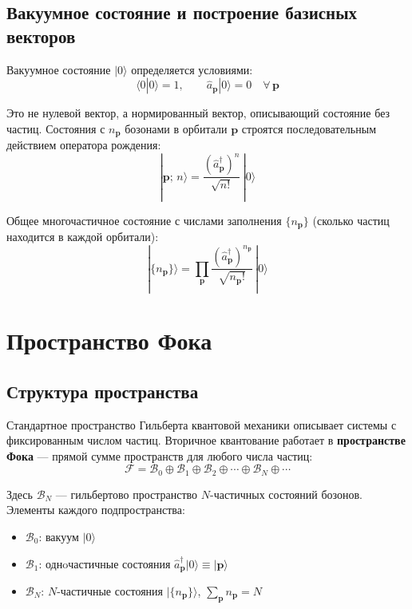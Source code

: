 \documentclass[../general/general]{subfiles}
\begin{document}
\subsection{Вакуумное состояние и построение базисных векторов}

Вакуумное состояние $|0\rangle$ определяется условиями:
\begin{equation}
    \langle 0|0\rangle = 1, \qquad \hat{a}_\mathbf{p}|0\rangle = 0 \quad \forall\,\mathbf{p}
\end{equation}

Это не нулевой вектор, а нормированный вектор, описывающий состояние без частиц. Состояния с $n_\mathbf{p}$ бозонами в орбитали $\mathbf{p}$ строятся последовательным действием оператора рождения:
\begin{equation}
    |\mathbf{p};\,n\rangle = \frac{(\hat{a}^\dagger_\mathbf{p})^n}{\sqrt{n!}}\,|0\rangle
\end{equation}

Общее многочастичное состояние с числами заполнения $\{n_\mathbf{p}\}$ (сколько частиц находится в каждой орбитали):
\begin{equation}
    |\{n_\mathbf{p}\}\rangle = \prod_\mathbf{p} \frac{(\hat{a}^\dagger_\mathbf{p})^{n_\mathbf{p}}}{\sqrt{n_\mathbf{p}!}}\,|0\rangle
    \label{eq:fock_state}
\end{equation}



\section{Пространство Фока}

\subsection{Структура пространства}

Стандартное пространство Гильберта квантовой механики описывает системы с фиксированным числом частиц. Вторичное квантование работает в \textbf{пространстве Фока} --- прямой сумме пространств для любого числа частиц:
\begin{equation}
    \mathcal{F} = \mathcal{B}_0 \oplus \mathcal{B}_1 \oplus \mathcal{B}_2 \oplus \cdots \oplus \mathcal{B}_N \oplus \cdots
\end{equation}

Здесь $\mathcal{B}_N$ --- гильбертово пространство $N$-частичных состояний бозонов. Элементы каждого подпространства:
\begin{itemize}
    \item $\mathcal{B}_0$: вакуум $|0\rangle$
    \item $\mathcal{B}_1$: однoчастичные состояния $\hat{a}^\dagger_\mathbf{p}|0\rangle \equiv |\mathbf{p}\rangle$
    \item $\mathcal{B}_N$: $N$-частичные состояния $|\{n_\mathbf{p}\}\rangle$, $\sum_\mathbf{p} n_\mathbf{p} = N$
\end{itemize}
\end{document}
